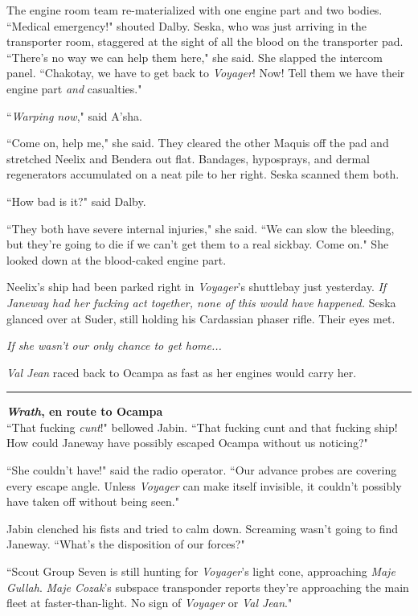 \documentclass[twoside,letterpaper,12pt]{memoir}
\begin{document}
The engine room team re-materialized with one engine part and two bodies. ``Medical emergency!" shouted Dalby. Seska, who was just arriving in the transporter room, staggered at the sight of all the blood on the transporter pad. ``There's no way we can help them here," she said. She slapped the intercom panel. ``Chakotay, we have to get back to \textit{Voyager}! Now! Tell them we have their engine part \textit{and} casualties."

``\textit{Warping now}," said A'sha.

``Come on, help me," she said. They cleared the other Maquis off the pad and stretched Neelix and Bendera out flat. Bandages, hyposprays, and dermal regenerators accumulated on a neat pile to her right. Seska scanned them both.

``How bad is it?" said Dalby.

``They both have severe internal injuries," she said. ``We can slow the bleeding, but they're going to die if we can't get them to a real sickbay. Come on." She looked down at the blood-caked engine part.

Neelix's ship had been parked right in \textit{Voyager}'s shuttlebay just yesterday. \textit{If Janeway had her fucking act together, none of this would have happened.} Seska glanced over at Suder, still holding his Cardassian phaser rifle. Their eyes met.

\textit{If she wasn't our only chance to get home...}

\textit{Val Jean} raced back to Ocampa as fast as her engines would carry her.

\begin{center}\rule{3cm}{0.4 pt}\end{center}

\noindent\textbf{\textit{Wrath}, en route to Ocampa}\\

``That fucking \textit{cunt}!" bellowed Jabin. ``That fucking cunt and that fucking ship! How could Janeway have possibly escaped Ocampa without us noticing?"

``She couldn't have!" said the radio operator. ``Our advance probes are covering every escape angle. Unless \textit{Voyager} can make itself invisible, it couldn't possibly have taken off without being seen."

Jabin clenched his fists and tried to calm down. Screaming wasn't going to find Janeway. ``What's the disposition of our forces?"

``Scout Group Seven is still hunting for \textit{Voyager}'s light cone, approaching \textit{Maje Gullah}. \textit{Maje Cozak}'s subspace transponder reports they're approaching the main fleet at faster-than-light. No sign of \textit{Voyager} or \textit{Val Jean}."
\end{document}
